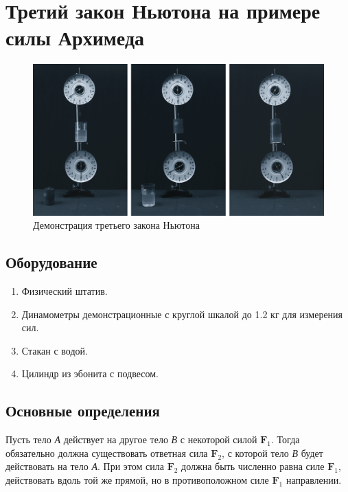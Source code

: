 \documentclass[All.tex]{subfiles}
\begin{document}


	\section{Третий закон Ньютона на примере силы Архимеда}

\begin{figure}[H]
	\centering 		
	\includegraphics[width=1\linewidth]{newton-3.png} 
	\caption{Демонстрация третьего закона Ньютона}
	\label{newton-3}
\end{figure}

\subsection*{\textcolor{PineGreen}{Оборудование}}

\begin{enumerate}
	\item Физический штатив.
	\item Динамометры демонстрационные с круглой шкалой до 1.2 кг для измерения сил.
	\item Стакан с водой.
	\item Цилиндр из эбонита с подвесом.
\end{enumerate}

\subsection*{\textcolor{PineGreen}{Основные определения}}

Пусть тело \textit{А} действует на другое тело \textit{В} с некоторой силой $\textbf{F}_1$. 
Тогда обязательно должна существовать ответная сила $\textbf{F}_2$, с которой 
тело \textit{В} будет действовать на тело \textit{А}.
При этом сила $\textbf{F}_2$ должна быть численно равна силе $\textbf{F}_1$, действовать вдоль той же прямой, но в противоположном силе $\textbf{F}_1$ направлении. 
\end{document}
